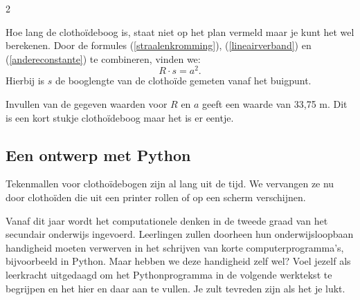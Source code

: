\begin{multicols}{2}

Hoe lang de clothoïdeboog is, staat niet op het plan vermeld maar je kunt het wel berekenen. Door de formules (\ref{straalenkromming}), (\ref{lineairverband}) en (\ref{andereconstante}) te combineren, vinden we:
\begin{equation} R \cdot s = a^2 \label{booglengte}. \end{equation}
Hierbij is $s$ de booglengte van de clothoïde gemeten vanaf het buigpunt.

Invullen van de gegeven waarden voor $R$ en $a$ geeft een waarde van 33,75 m. Dit is een kort stukje clothoïdeboog maar het is er eentje.

\subsection{Een ontwerp met Python}

Tekenmallen voor clothoïdebogen zijn al lang uit de tijd. We vervangen ze nu door clothoïden die uit een printer rollen of op een scherm verschijnen.

Vanaf dit jaar wordt het computationele denken in de tweede graad van het secundair onderwijs ingevoerd. Leerlingen zullen doorheen hun onderwijsloopbaan handigheid moeten verwerven in het schrijven van korte computerprogramma's, bijvoorbeeld in Python. Maar hebben we deze handigheid zelf wel? Voel jezelf als leerkracht uitgedaagd om het Pythonprogramma in de volgende werktekst te begrijpen en het hier en daar aan te vullen. Je zult tevreden zijn als het je lukt.
\end{multicols}


